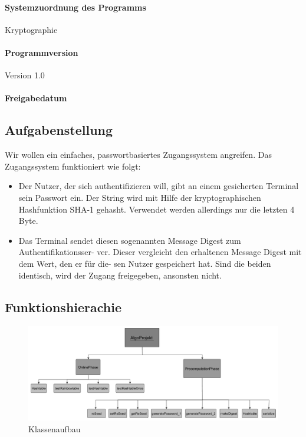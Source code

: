 \documentclass[11pt]{article}
\begin{document}
  \paragraph{Systemzuordnung des Programms}
  Kryptographie
  \paragraph{Programmversion}
  Version 1.0
  \paragraph{Freigabedatum}
  \date{26.11.2013}
  \newline
  \newline
 \subsection{Aufgabenstellung}
  Wir wollen ein einfaches, passwortbasiertes Zugangssystem angreifen. Das Zugangssystem
funktioniert wie folgt:
\begin{itemize} 
\item Der Nutzer, der sich authentifizieren will, gibt an einem gesicherten Terminal sein
Passwort ein. Der String wird mit Hilfe der kryptographischen Hashfunktion SHA-1
gehasht. Verwendet werden allerdings nur die letzten 4 Byte.
\item Das Terminal sendet diesen sogenannten Message Digest zum Authentifikationsser-
ver. Dieser vergleicht den erhaltenen Message Digest mit dem Wert, den er für die-
sen Nutzer gespeichert hat. Sind die beiden identisch, wird der Zugang freigegeben,
ansonsten nicht. 
\end{itemize}
\subsection{Funktionshierachie}
  \begin{figure}
  \centering
  \includegraphics[width=\textwidth, clip]{Bild.pdf} 
  \caption{Klassenaufbau} 
  \end{figure} 
\end{document}

